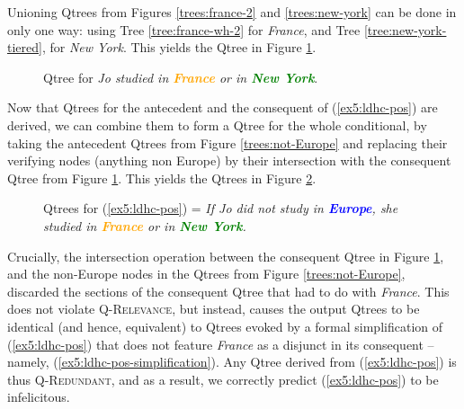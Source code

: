 Unioning Qtrees from Figures \ref{trees:france-2} and \ref{trees:new-york} can be done in only one way: using Tree \ref{tree:france-wh-2} for \textit{France}, and Tree \ref{tree:new-york-tiered}, for \textit{New York}. This yields the Qtree in Figure \ref{tree:france-or-new-york}.

\begin{figure}[H]
	\centering
	\caption{Qtree for \textit{Jo studied in \textcolor{orange}{\textbf{France}} or in \textcolor{green}{\textbf{New York}}}.}\label{tree:france-or-new-york}
\end{figure}

Now that Qtrees for the antecedent and the consequent of (\ref{ex5:ldhc-pos}) are derived, we can combine them to form a Qtree for the whole conditional, by taking the antecedent Qtrees from Figure \ref{trees:not-Europe} and replacing their verifying nodes (anything non Europe) by their intersection with the consequent Qtree from Figure \ref{tree:france-or-new-york}. This yields the Qtrees in Figure \ref{trees:if-not-Europe-then-france-or-new-york}. 

\begin{figure}[H]
	\centering
	\begin{subfigure}[b]{.45\linewidth}
		\centering
		\caption{}
	\end{subfigure}
	\hfill
	\begin{subfigure}[b]{.45\linewidth}
		\centering
		\caption{}
	\end{subfigure}
	\caption{Qtrees for (\ref{ex5:ldhc-pos}) = \textit{If Jo did not study in \textcolor{blue}{\textbf{Europe}}, she studied in \textcolor{orange}{\textbf{France}} or in \textcolor{green}{\textbf{New York}}.}}\label{trees:if-not-Europe-then-france-or-new-york}
\end{figure}

Crucially, the intersection operation between the consequent Qtree in Figure \ref{tree:france-or-new-york}, and the non-Europe nodes in the Qtrees from Figure \ref{trees:not-Europe}, discarded the sections of the consequent Qtree that had to do with \textit{France}. This does not violate \textsc{Q-Relevance}, but instead, causes the output Qtrees to be identical (and hence, equivalent) to Qtrees evoked by a formal simplification of (\ref{ex5:ldhc-pos}) that does not feature \textit{France} as a disjunct in its consequent -- namely, (\ref{ex5:ldhc-pos-simplification}). Any Qtree derived from (\ref{ex5:ldhc-pos}) is thus \textsc{Q-Redundant}, and as a result, we correctly predict (\ref{ex5:ldhc-pos}) to be infelicitous.\\

